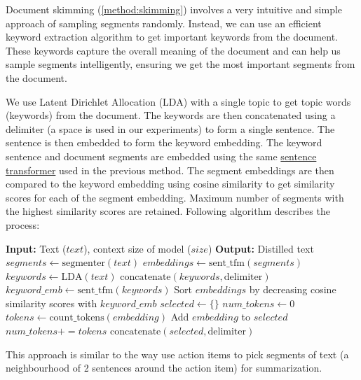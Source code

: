 		Document skimming (\ref{method:skimming}) involves a very intuitive and simple approach of
		sampling segments randomly.
		Instead, we can use an efficient keyword extraction algorithm to get important keywords
		from the document.
		These keywords capture the overall meaning of the document and can help us sample segments
		intelligently, ensuring we get the most important segments from the document.

		We use Latent Dirichlet Allocation (LDA) \cite{blei2003latent} with a single topic to get topic
		words (keywords) from the document.
		The keywords are then concatenated using a delimiter (a space is used in our experiments) to
		form a single sentence.
		The sentence is then embedded to form the keyword embedding.
		The keyword sentence and document segments are embedded using the same
		\href{https://huggingface.co/sentence-transformers/all-MiniLM-L6-v2}{sentence transformer}
		used in the previous method.
		The segment embeddings are then compared to the keyword embedding using cosine similarity
		to get similarity scores for each of the segment embedding.
		Maximum number of segments with the highest similarity scores are retained.
		Following algorithm describes the process:

		\begin{algorithm}
			\begin{algorithmic}
				\State \textbf{Input:} Text ($text$), context size of model ($size$)
				\State \textbf{Output:} Distilled text
				\State $segments \leftarrow \text{segmenter}(text)$
				\State $embeddings \leftarrow \text{sent\_tfm}(segments)$
				\State $keywords \leftarrow \text{LDA}(text)$
				\State $\text{concatenate}(keywords, \text{delimiter})$
				\State $keyword\_emb \leftarrow \text{sent\_tfm}(keywords)$
				\State Sort $embeddings$ by decreasing cosine similarity scores with $keyword\_emb$
				\State $selected \leftarrow \{\}$
				\State $num\_tokens \leftarrow 0$
					\State $tokens \leftarrow \text{count\_tokens}(embedding)$
						\State Add $embedding$ to $selected$
						\State $num\_tokens += tokens$
					\EndIf
				\EndFor
				\State $\text{concatenate}(selected, \text{delimiter})$
				\State {}
			\end{algorithmic}
		\end{algorithm}

		This approach is similar to the way \citet{golia2024action} use action items to pick segments
		of text (a neighbourhood of 2 sentences around the action item) for summarization.
